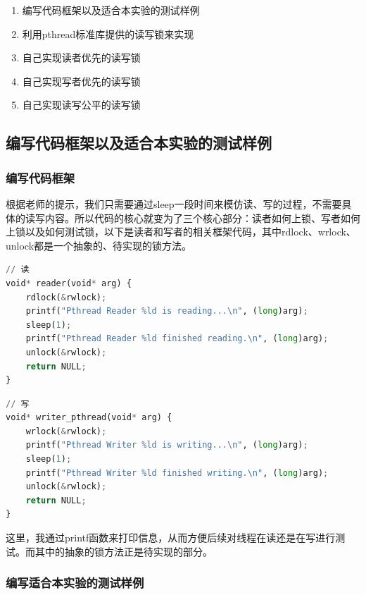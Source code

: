 \documentclass{LabReport}
\begin{document}
	\begin{enumerate}
		\item 编写代码框架以及适合本实验的测试样例
		\item 利用pthread标准库提供的读写锁来实现
		\item 自己实现读者优先的读写锁
		\item 自己实现写者优先的读写锁
		\item 自己实现读写公平的读写锁
	\end{enumerate}
	
	\subsection{编写代码框架以及适合本实验的测试样例}
	
	\subsubsection{编写代码框架}
	
	根据老师的提示，我们只需要通过sleep一段时间来模仿读、写的过程，不需要具体的读写内容。所以代码的核心就变为了三个核心部分：读者如何上锁、写者如何上锁以及如何测试锁，以下是读者和写者的相关框架代码，其中rdlock、wrlock、unlock都是一个抽象的、待实现的锁方法。
	
\begin{lstlisting}[language=python,frame=shadowbox]
// 读
void* reader(void* arg) {
	rdlock(&rwlock);
	printf("Pthread Reader %ld is reading...\n", (long)arg);
	sleep(1);
	printf("Pthread Reader %ld finished reading.\n", (long)arg);
	unlock(&rwlock);
	return NULL;
}
\end{lstlisting}

\begin{lstlisting}[language=python,frame=shadowbox]
// 写
void* writer_pthread(void* arg) {
	wrlock(&rwlock);
	printf("Pthread Writer %ld is writing...\n", (long)arg);
	sleep(1);
	printf("Pthread Writer %ld finished writing.\n", (long)arg);
	unlock(&rwlock);
	return NULL;
}
\end{lstlisting}

	这里，我通过printf函数来打印信息，从而方便后续对线程在读还是在写进行测试。而其中的抽象的锁方法正是待实现的部分。
	
\subsubsection{编写适合本实验的测试样例}
\end{document}
